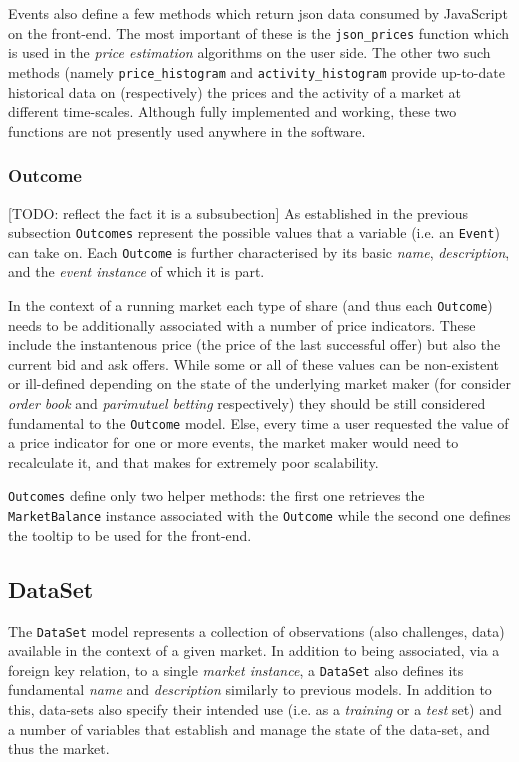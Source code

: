 \documentclass[bsc,frontabs,twoside,singlespacing,parskip,deptreport]{infthesis}     %
\begin{document}
	Events also define a few methods which return json data consumed by JavaScript on the front-end. The most important of these is the {\tt json\_prices} function which is used in the {\it price estimation} algorithms on the user side. The other two such methods (namely {\tt price\_histogram} and {\tt activity\_histogram} provide up-to-date historical data on (respectively) the prices and the activity of a market at different time-scales. Although fully implemented and working, these two functions are not presently used anywhere in the software. 

\subsubsection{Outcome}
	[TODO: reflect the fact it is a subsubection]
	As established in the previous subsection {\tt Outcomes} represent the possible values that a variable (i.e. an {\tt Event}) can take on. Each {\tt Outcome} is further characterised by its basic {\it name}, {\it description}, and the {\it event instance} of which it is part. 

	In the context of a running market each type of share (and thus each {\tt Outcome}) needs to be additionally associated with a number of price indicators. These include the instantenous price (the price of the last successful offer) but also the current bid and ask offers. While some or all of these values can be non-existent or ill-defined depending on the state of the underlying market maker (for consider {\em order book} and {\em parimutuel betting} respectively) they should be still considered fundamental to the {\tt Outcome} model. Else, every time a user requested the value of a price indicator for one or more events, the market maker would need to recalculate it, and that makes for extremely poor scalability. 

	{\tt Outcomes} define only two helper methods: the first one retrieves the {\tt MarketBalance} instance associated with the {\tt Outcome} while the second one defines the tooltip to be used for the front-end. 

\subsection{DataSet}

	The {\tt DataSet} model represents a collection of observations (also challenges, data) available in the context of a given market. In addition to being associated, via a foreign key relation, to a single {\it market instance}, a {\tt DataSet} also defines its fundamental {\it name} and {\it description} similarly to previous models. In addition to this, data-sets also specify their intended use (i.e. as a {\it training} or a {\it test} set) and a number of variables that establish and manage the state of the data-set, and thus the market.
	
\end{document}
